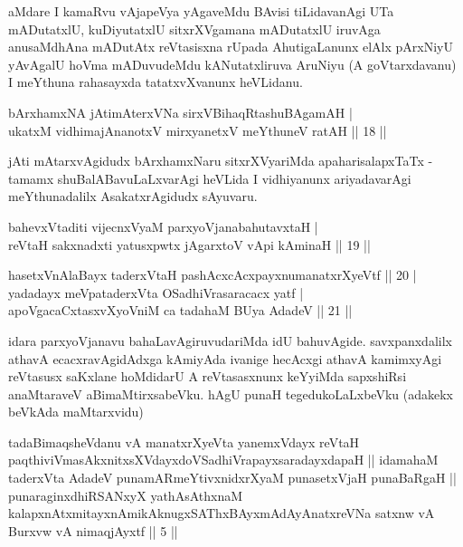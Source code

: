 \begin{artha}
aMdare I kamaRvu vAjapeVya yAgaveMdu BAvisi tiLidavanAgi UTa 
mADutatxlU, kuDiyutatxlU sitxrXVgamana mADutatxlU iruvAga anusaMdhAna 
mADutAtx reVtasisxna rUpada AhutigaLanunx elAlx pArxNiyU yAvAgalU 
hoVma mADuvudeMdu kANutatxliruva AruNiyu (A goVtarxdavanu) I meYthuna 
rahasayxda tatatxvXvanunx heVLidanu.
\end{artha}


\begin{shl}
bArxhamxNA jAtimAterxVNa sirxVBihaqRtashuBAgamAH | \\
ukatxM vidhimajAnanotxV mirxyanetxV meYthuneV ratAH \hfill|| 18 || 
\end{shl}

\begin{artha}
jAti mAtarxvAgidudx bArxhamxNaru sitxrXVyariMda apaharisalapxTaTx - 
tamamx shuBalABavuLaLxvarAgi heVLida I vidhiyanunx ariyadavarAgi 
meYthunadalilx AsakatxrAgidudx sAyuvaru.
\end{artha}

\begin{shl}
bahevxVtaditi vijecnxVyaM parxyoVjanabahutavxtaH | \\
reVtaH sakxnadxti yatusxpwtx jAgarxtoV vA\s pi kAminaH \hfill|| 19 || 
\end{shl}

\begin{shl}
hasetxVnA\s \s laBayx taderxVtaH pashAcxcAcxpayxnumanatxrXyeVtf \hfill|| 20 | \\
yadadayx meV\s pataderxVta OSadhiVrasaracacx yatf | \\
apoV\s gacaCxtasxvXyoVniM ca tadahaM BUya AdadeV \hfill|| 21 || 
\end{shl}

\begin{artha}
idara parxyoVjanavu bahaLavAgiruvudariMda idU bahuvAgide. 
savxpanxdalilx athavA ecacxravAgidAdxga kAmiyAda ivanige hecAcxgi 
athavA kamimxyAgi reVtasusx saKxlane hoMdidarU A reVtasasxnunx 
keYyiMda sapxshiRsi anaMtaraveV aBimaMtirxsabeVku. hAgU punaH 
tegedukoLaLxbeVku (adakekx beVkAda maMtarxvidu)
\end{artha}

\begin{kandikeshl}
tadaBimaqsheVdanu vA manatxrXyeVta yanemxV\s dayx reVtaH paqthiviVmasAkxnitxsXVdayxdoVSadhiVrapayxsaradayxdapaH || idamahaM taderxVta AdadeV punamARmeYtivxnidxrXyaM punasetxVjaH punaBaRgaH || punaraginxdhiRSANxyX yathAsAthxnaM kalapxnAtxmitayxnAmikAknugxSAThxBAyxmAdAyAnatxreVNa satxnw vA Burxvw vA nimaqjAyxtf || 5 ||
\end{kandikeshl}

